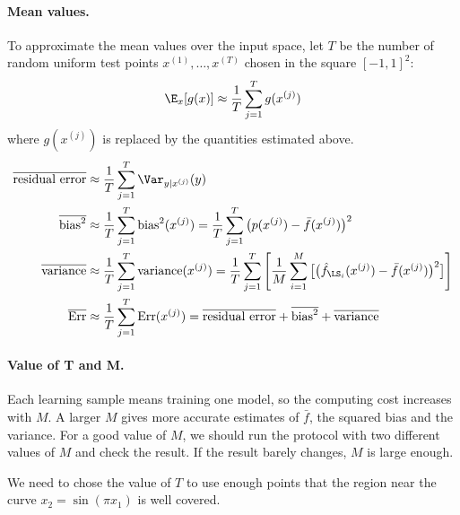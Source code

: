\paragraph{Mean values.}
To approximate the mean values over the input space, let $T$ be the number of random uniform test points $x^{(1)},\dots,x^{(T)}$ chosen in the square $[-1, 1]^2$: \[\E_x[g(x)] \approx\frac{1}{T}\sum_{j=1}^{T}g(x^{(j)})\] where $g(x^{(j)})$ is replaced by the quantities estimated above.
\begin{align*}
    \overline{\text{residual error}}&\approx \frac{1}{T}\sum_{j=1}^{T}\Var_{y\mid x^{(j)}}(y) \\
    \overline{\text{bias}^2}&\approx \frac{1}{T}\sum_{j=1}^{T}\text{bias}^2(x^{(j)}) = \frac{1}{T}\sum_{j=1}^{T}\big(p(x^{(j)})-\bar{f}(x^{(j)})\big)^2\\
    \overline{\text{variance}}&\approx\frac{1}{T}\sum_{j=1}^{T}\text{variance}(x^{(j)})=\frac{1}{T}\sum_{j=1}^{T}\Bigg[\frac{1}{M}\sum_{i=1}^M\big[\big(\hat{f}_{\LS_i}(x^{(j)})-\bar{f}(x^{(j)})\big)^2\big]\Bigg]\\
    \overline{\mathrm{Err}}&\approx \frac{1}{T}\sum_{j=1}^{T}\mathrm{Err}(x^{(j)}) = \overline{\text{residual error}}+\overline{\text{bias}^2}+\overline{\text{variance}}
\end{align*}
\paragraph{Value of T and M.} Each learning sample means training one model, so the computing cost increases with $M$. A larger $M$ gives more accurate estimates of $\bar{f}$, the squared bias and the variance. For a good value of $M$, we should run the protocol with two different values of $M$ and check the result. If the result barely changes, $M$ is large enough.

We need to chose the value of $T$ to use enough points that the region near the curve $x_2=\sin(\pi x_1)$ is well covered.